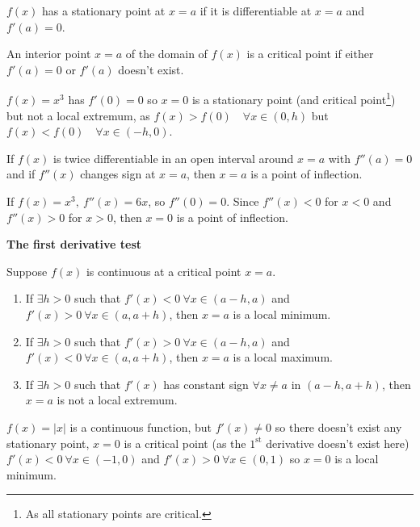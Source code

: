 \documentclass[10pt, a4paper]{article}
\begin{document}
\begin{definition}
    $f(x)$ has a stationary point at $x = a$ if it is differentiable at $x = a$ and $f'(a) = 0$.
\end{definition}

\begin{definition}
    An interior point $x = a$ of the domain of $f(x)$ is a critical point if either $f'(a) = 0$ or $f'(a)$ doesn't exist.
\end{definition}

\begin{example}
    $f(x) = x ^ 3$ has $f'(0) = 0$ so $x = 0$ is a stationary point (and critical point\footnote{As all stationary points are critical.}) but not a local extremum, as $f(x) > f(0)\quad\forall x \in (0, h)$ but $f(x) < f(0)\quad \forall x \in (-h, 0)$.
\end{example}

\begin{definition}
    If $f(x)$ is twice differentiable in an open interval around $x = a$ with $f''(a) = 0$ and if $f''(x)$ changes sign at $x = a$,
    then $x = a$ is a point of inflection.
\end{definition}

\begin{example}
    If $f(x) = x ^ 3,\ f''(x) = 6x$, so $f''(0) = 0$.
    Since $f''(x) < 0$ for $x < 0$ and $f''(x) > 0$ for $x > 0$,
    then $x = 0$ is a point of inflection.
\end{example}

\textbf{The first derivative test}

Suppose $f(x)$ is continuous at a critical point $x = a$.
\begin{enumerate}[label = \roman*)]
    \item If $\exists h > 0$ such that $f'(x) < 0\ \forall x \in (a - h, a)$ and $f'(x) > 0\ \forall x \in (a, a + h)$,
    then $x = a$ is a local minimum.
    \item If $\exists h > 0$ such that $f'(x) > 0\ \forall x \in (a - h, a)$ and $f'(x) < 0\ \forall x \in (a, a + h)$,
    then $x = a$ is a local maximum.
    \item If $\exists h > 0$ such that $f'(x)$ has constant sign $\forall x \neq a$ in $(a - h, a + h)$,
    then $x = a$ is not a local extremum.
\end{enumerate}

\begin{example}
    $f(x) = |x|$ is a continuous function,
    but $f'(x) \neq 0$ so there doesn't exist any stationary point,
    $x = 0$ is a critical point
    (as the $1^{\text{st}}$ derivative doesn't exist here)
    $f'(x) < 0\ \forall x \in (-1, 0)$ and $f'(x) > 0 \ \forall x \in (0, 1)$
    so $x = 0$ is a local minimum.
\end{example}
\end{document}
